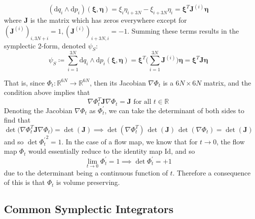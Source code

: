 \documentclass{article}
\begin{document}
      \begin{equation}
        (\mathrm{d}q_i \wedge \mathrm{d} p_i)(\boldsymbol{\xi}, \boldsymbol{\eta}) = \xi_i\eta_{i + 3N} - \xi_{i + 3N} \eta_i = \boldsymbol{\xi}^T \mathbf{J}^{(i)} \boldsymbol{\eta}
      \end{equation}
      where $\mathbf{J}$ is the matrix which has zeros everywhere except for $(\mathbf{J}^{(i)})_{i, 3N + i} = 1, (\mathbf{J}^{(i)})_{i + 3N, i} = -1$. Summing these terms results in the symplectic 2-form, denoted $\psi_S$: 
      \begin{equation}
        \psi_S \coloneqq \sum_{i=1}^{3N} \mathrm{d}q_i \wedge \mathrm{d} p_i (\boldsymbol{\xi}, \boldsymbol{\eta}) = \boldsymbol{\xi}^T \bigg( \sum_{i=1}^{3N} \mathbf{J}^{(i)} \bigg) \boldsymbol{\eta} = \boldsymbol{\xi}^T \mathbf{J} \boldsymbol{\eta}
      \end{equation}

      That is, since $\Phi_t: \mathbb{R}^{6N} \longrightarrow \mathbb{R}^{6N}$, then its Jacobian $\nabla \Phi_t$ is a $6N \times 6N$ matrix, and the condition above implies that 
      \begin{equation}
        \nabla \Phi_t^T \mathbf{J} \nabla \Phi_t = \mathbf{J} \text{ for all } t \in \mathbb{R}
      \end{equation}
      Denoting the Jacobian $\nabla \Phi_t$ as $\Phi_t^\prime$, we can take the determinant of both sides to find that 
      \begin{equation}
        \det\big(\nabla \Phi_t^T \mathbf{J} \nabla \Phi_t\big) = \det(\mathbf{J}) \implies \det(\nabla \Phi_t^T) \, \det(\mathbf{J})\, \det(\nabla \Phi_t) = \det(\mathbf{J})
      \end{equation}
      and so $\det{\Phi_t^\prime}^2 = 1$. In the case of a flow map, we know that for $t \rightarrow 0$, the flow map $\Phi_{t}$ would essentially reduce to the identity map $\mathrm{Id}$, and so
      \begin{equation}
        \lim_{t \rightarrow 0} \Phi_t^\prime = 1 \implies \det{\Phi_t^\prime} = + 1
      \end{equation}
      due to the determinant being a continuous function of $t$. Therefore a consequence of this is that $\Phi_t$ is volume preserving. 

  \subsection{Common Symplectic Integrators}
\end{document}
